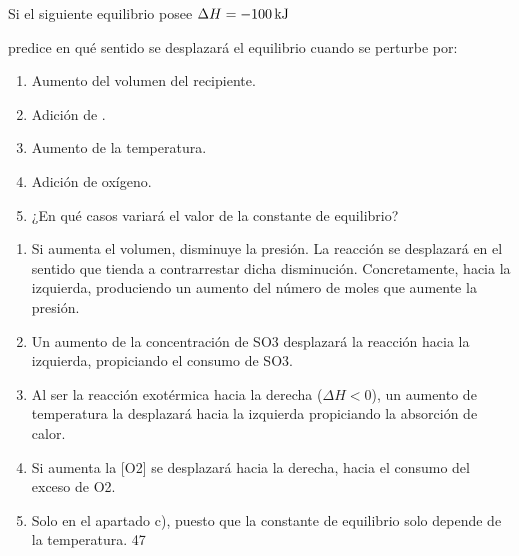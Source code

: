 \begin{exercise} %
    Si el siguiente equilibrio posee \(\Delta H = \energia[kj]{-100}\)
    \begin{center}
    \end{center}
    predice en qué sentido se desplazará el equilibrio cuando se perturbe por:
    \begin{enumerate}[label=\letraminuscula]
        \item Aumento del volumen del recipiente.
        \item Adición de .
        \item Aumento de la temperatura.
        \item Adición de oxígeno.
        \item ¿En qué casos variará el valor de la constante de equilibrio?
    \end{enumerate}
    \begin{solu}
        \begin{enumerate}[label=\letraminuscula]
            \item Si aumenta el volumen, disminuye la presión. La reacción se desplazará en el sentido que tienda
            a contrarrestar
            dicha disminución. Concretamente, hacia la izquierda, produciendo un aumento
            del número de moles que aumente la presión.
            \item Un aumento de la concentración de SO3 desplazará la reacción hacia la izquierda, propiciando
            el consumo de SO3.
            \item Al ser la reacción exotérmica hacia la derecha (\(\Delta H < 0  \)), un aumento de temperatura la desplazará
            hacia la izquierda propiciando la absorción de calor.
            \item Si aumenta la [O2] se desplazará hacia la derecha, hacia el consumo del exceso de O2.
            \item Solo en el apartado c), puesto que la constante de equilibrio solo depende de la temperatura.
            47
        \end{enumerate}
    \end{solu}
\end{exercise}

